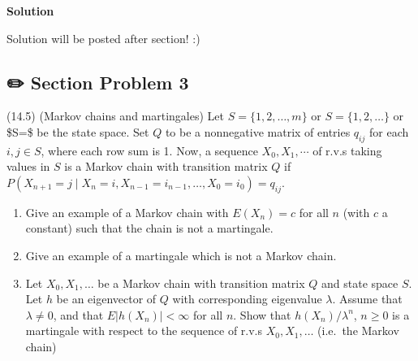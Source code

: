 \documentclass[
  letterpaper,
  DIV=11,
  numbers=noendperiod]{scrreprt}
\theoremstyle{definition}
\theoremstyle{plain}
\theoremstyle{remark}
\begin{document}
\begin{tcolorbox}[enhanced jigsaw, colback=white, leftrule=.75mm, breakable, toprule=.15mm, rightrule=.15mm, opacityback=0, left=2mm, bottomrule=.15mm, arc=.35mm, colframe=quarto-callout-tip-color-frame]
\begin{minipage}[t]{5.5mm}
\textcolor{quarto-callout-tip-color}{\faLightbulb}
\end{minipage}%
\begin{minipage}[t]{\textwidth - 5.5mm}

\textbf{Solution}\vspace{2mm}

Solution will be posted after section! :)

\end{minipage}%
\end{tcolorbox}

\hypertarget{section-problem-3-6}{%
\subsection*{✏️ Section Problem 3}\label{section-problem-3-6}}

(14.5) (Markov chains and martingales) Let \(S=\{1,2,\dotsc ,m\}\) or
\(S=\{1,2,\dotsc \}\) or \$S=\ZZ \$ be the state space. Set \(Q\) to be
a nonnegative matrix of entries \(q_{ij}\) for each \(i,j\in S\), where
each row sum is 1. Now, a sequence \(X_{0} ,X_{1} ,\cdots\) of r.v.s
taking values in \(S\) is a Markov chain with transition matrix \(Q\) if
\(P(X_{n+1} =j\mid X_{n} =i,X_{n-1} =i_{n-1} ,\dotsc ,X_{0} =i_{0} )=q_{ij}\).

\begin{enumerate}
\def\labelenumi{(\alph{enumi})}
\item
  Give an example of a Markov chain with \(E(X_{n} )=c\) for all \(n\)
  (with \(c\) a constant) such that the chain is not a martingale.
\item
  Give an example of a martingale which is not a Markov chain.
\item
  Let \(X_{0} ,X_{1} ,\dotsc\) be a Markov chain with transition matrix
  \(Q\) and state space \(S\). Let \(h\) be an eigenvector of \(Q\) with
  corresponding eigenvalue \(\lambda\). Assume that \(\lambda \neq 0\),
  and that \(E|h(X_{n} )|< \infty\) for all \(n\). Show that
  \(h(X_{n} )/\lambda ^{n}\), \(n\geq 0\) is a martingale with respect
  to the sequence of r.v.s \(X_{0} ,X_{1} ,\dotsc\) (i.e.~the Markov
  chain)
\end{enumerate}
\end{document}
